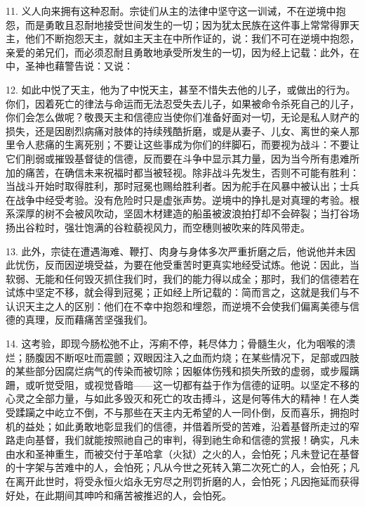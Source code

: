 11. 义人向来拥有这种忍耐。宗徒们从主的法律中坚守这一训诫，不在逆境中抱怨，而是勇敢且忍耐地接受世间发生的一切；因为犹太民族在这件事上常常得罪天主，他们不断抱怨天主，就如主天主在中所作证的，说：我们不可在逆境中抱怨，亲爱的弟兄们，而必须忍耐且勇敢地承受所发生的一切，因为经上记载：此外，在中，圣神也藉警告说：又说：\par

12. 如此中悦了天主，他为了中悦天主，甚至不惜失去他的儿子，或做出的行为。你们，因着死亡的律法与命运而无法忍受失去儿子，如果被命令杀死自己的儿子，你们会怎么做呢？敬畏天主和信德应当使你们准备好面对一切，无论是私人财产的损失，还是因剧烈病痛对肢体的持续残酷折磨，或是从妻子、儿女、离世的亲人那里令人悲痛的生离死别；不要让这些事成为你们的绊脚石，而要视为战斗：不要让它们削弱或摧毁基督徒的信德，反而要在斗争中显示其力量，因为当今所有患难所加的痛苦，在确信未来祝福时都当被轻视。除非战斗先发生，否则不可能有胜利：当战斗开始时取得胜利，那时冠冕也赐给胜利者。因为舵手在风暴中被认出；士兵在战争中经受考验。没有危险时只是虚张声势。逆境中的挣扎是对真理的考验。根系深厚的树不会被风吹动，坚固木材建造的船虽被波浪拍打却不会碎裂；当打谷场扬出谷粒时，强壮饱满的谷粒藐视风力，而空穗则被吹来的阵风带走。\par

13. 此外，宗徒在遭遇海难、鞭打、肉身与身体多次严重折磨之后，他说他并未因此忧伤，反而因逆境受益，为要在他受重苦时更真实地经受试炼。他说：因此，当软弱、无能和任何毁灭抓住我们时，我们的能力得以成全；那时，我们的信德若在试炼中坚定不移，就会得到冠冕；正如经上所记载的：简而言之，这就是我们与不认识天主之人的区别：他们在不幸中抱怨和埋怨，而逆境不会使我们偏离美德与信德的真理，反而藉痛苦坚强我们。\par

14. 这考验，即现今肠松弛不止，泻痢不停，耗尽体力；骨髓生火，化为咽喉的溃烂；肠腹因不断呕吐而震颤；双眼因注入之血而灼烧；在某些情况下，足部或四肢的某些部分因腐烂病气的传染而被切除；因躯体伤残和损失所致的虚弱，或步履蹒跚，或听觉受阻，或视觉昏暗——这一切都有益于作为信德的证明。以坚定不移的心灵之全部力量，与如此多毁灭和死亡的攻击搏斗，这是何等伟大的精神！在人类受蹂躏之中屹立不倒，不与那些在天主内无希望的人一同仆倒，反而喜乐，拥抱时机的益处；如此勇敢地彰显我们的信德，并借着所受的苦难，沿着基督所走过的窄路走向基督，我们就能按照祂自己的审判，得到祂生命和信德的赏报！确实，凡未由水和圣神重生，而被交付于革哈拿（火狱）之火的人，会怕死；凡未登记在基督的十字架与苦难中的人，会怕死；凡从今世之死转入第二次死亡的人，会怕死；凡在离开此世时，将受永恒火焰永无穷尽之刑罚折磨的人，会怕死；凡因拖延而获得好处，在此期间其呻吟和痛苦被推迟的人，会怕死。\par

